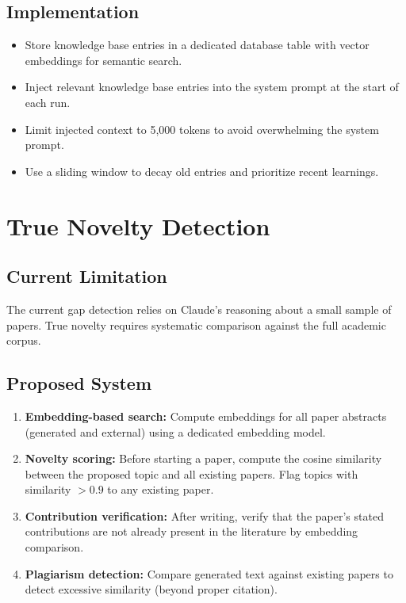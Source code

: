 \subsection{Implementation}

\begin{itemize}
  \item Store knowledge base entries in a dedicated database table with vector embeddings for semantic search.
  \item Inject relevant knowledge base entries into the system prompt at the start of each run.
  \item Limit injected context to 5,000 tokens to avoid overwhelming the system prompt.
  \item Use a sliding window to decay old entries and prioritize recent learnings.
\end{itemize}

\section{True Novelty Detection}
\label{sec:improve:novelty}

\subsection{Current Limitation}

The current gap detection relies on Claude's reasoning about a small sample of papers.
True novelty requires systematic comparison against the full academic corpus.

\subsection{Proposed System}

\begin{enumerate}
  \item \textbf{Embedding-based search:} Compute embeddings for all paper abstracts (generated and external) using a dedicated embedding model.
  \item \textbf{Novelty scoring:} Before starting a paper, compute the cosine similarity between the proposed topic and all existing papers. Flag topics with similarity $> 0.9$ to any existing paper.
  \item \textbf{Contribution verification:} After writing, verify that the paper's stated contributions are not already present in the literature by embedding comparison.
  \item \textbf{Plagiarism detection:} Compare generated text against existing papers to detect excessive similarity (beyond proper citation).
\end{enumerate}


